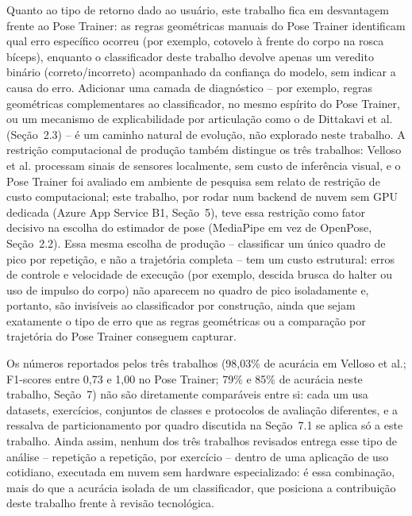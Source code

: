 \documentclass[12pt]{article}
\begin{document}
Quanto ao tipo de retorno dado ao usuário, este trabalho fica em
desvantagem frente ao Pose Trainer: as regras geométricas manuais do Pose
Trainer identificam qual erro específico ocorreu (por exemplo, cotovelo à
frente do corpo na rosca bíceps), enquanto o classificador deste trabalho
devolve apenas um veredito binário (correto/incorreto) acompanhado da
confiança do modelo, sem indicar a causa do erro. Adicionar uma camada de
diagnóstico -- por exemplo, regras geométricas complementares ao
classificador, no mesmo espírito do Pose Trainer, ou um mecanismo de
explicabilidade por articulação como o de Dittakavi et
al.~\cite{dittakavi2022posetutor} (Seção~2.3) -- é um caminho natural de
evolução, não explorado neste trabalho. A restrição computacional de
produção também distingue os três trabalhos: Velloso et al. processam
sinais de sensores localmente, sem custo de inferência visual, e o Pose
Trainer foi avaliado em ambiente de pesquisa sem relato de restrição de
custo computacional; este trabalho, por rodar num backend de nuvem sem GPU
dedicada (Azure App Service B1, Seção~5), teve essa restrição como fator
decisivo na escolha do estimador de pose (MediaPipe em vez de OpenPose,
Seção~2.2). Essa mesma escolha de produção -- classificar um único quadro
de pico por repetição, e não a trajetória completa -- tem um custo
estrutural: erros de controle e velocidade de execução (por exemplo,
descida brusca do halter ou uso de impulso do corpo) não aparecem no
quadro de pico isoladamente e, portanto, são invisíveis ao classificador
por construção, ainda que sejam exatamente o tipo de erro que as regras
geométricas ou a comparação por trajetória do Pose Trainer conseguem
capturar.

Os números reportados pelos três trabalhos (98,03\% de acurácia em
Velloso et al.; F1-scores entre 0,73 e 1,00 no Pose Trainer; 79\% e 85\%
de acurácia neste trabalho, Seção~7) não são diretamente comparáveis entre
si: cada um usa datasets, exercícios, conjuntos de classes e protocolos de
avaliação diferentes, e a ressalva de particionamento por quadro discutida
na Seção~7.1 se aplica só a este trabalho. Ainda assim, nenhum dos três
trabalhos revisados entrega esse tipo de análise -- repetição a repetição,
por exercício -- dentro de uma aplicação de uso cotidiano, executada em
nuvem sem hardware especializado: é essa combinação, mais do que a
acurácia isolada de um classificador, que posiciona a contribuição deste
trabalho frente à revisão tecnológica.
\end{document}
